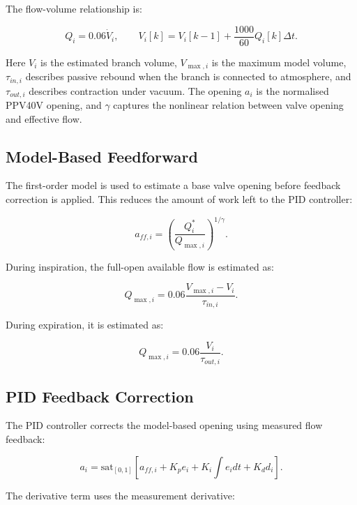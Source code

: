 \documentclass[11pt,a4paper]{article}
\begin{document}
The flow-volume relationship is:

\begin{equation}
  Q_i = 0.06\dot V_i,
  \qquad
  V_i[k]=V_i[k-1]+\frac{1000}{60}Q_i[k]\Delta t.
\end{equation}

Here $V_i$ is the estimated branch volume, $V_{\max,i}$ is the maximum model volume, $\tau_{in,i}$ describes passive rebound when the branch is connected to atmosphere, and $\tau_{out,i}$ describes contraction under vacuum. The opening $a_i$ is the normalised PPV40V opening, and $\gamma$ captures the nonlinear relation between valve opening and effective flow.

\subsection{Model-Based Feedforward}

The first-order model is used to estimate a base valve opening before feedback correction is applied. This reduces the amount of work left to the PID controller:

\begin{equation}
  a_{ff,i} =
  \left(
    \frac{Q^*_i}{Q_{\max,i}}
  \right)^{1/\gamma}.
\end{equation}

During inspiration, the full-open available flow is estimated as:

\begin{equation}
  Q_{\max,i}=0.06\frac{V_{\max,i}-V_i}{\tau_{in,i}}.
\end{equation}

During expiration, it is estimated as:

\begin{equation}
  Q_{\max,i}=0.06\frac{V_i}{\tau_{out,i}}.
\end{equation}

\subsection{PID Feedback Correction}

The PID controller corrects the model-based opening using measured flow feedback:

\begin{equation}
  a_i =
  \mathrm{sat}_{[0,1]}
  \left[
    a_{ff,i}
    +K_p e_i
    +K_i\int e_i dt
    +K_d d_i
  \right].
\end{equation}

The derivative term uses the measurement derivative:
\end{document}

